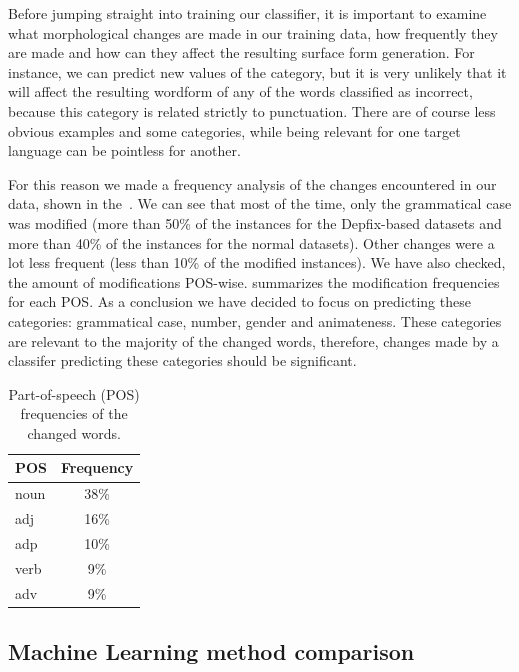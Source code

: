 Before jumping straight into training our classifier, it is important to examine what morphological
changes are made in our training data, how frequently they are made and how can they affect the resulting
surface form generation. For instance, we can predict new values of the  category,
but it is very unlikely that it will affect the resulting wordform of any of the words
classified as incorrect, because this category is related strictly to punctuation. There are
of course less obvious examples and some categories, while being relevant for one target language
can be pointless for another.

For this reason we made a frequency analysis of the changes encountered
in our data, shown in the~. We can see that most of the time, only the grammatical
case was modified (more than 50\% of the instances for the Depfix-based datasets and more than 40\% of the instances for
the normal datasets). Other changes were a lot less frequent (less than 10\% of the modified instances).
We have also checked, the amount of modifications POS-wise.  summarizes the modification frequencies for each
POS. As a conclusion we have decided to focus on predicting these categories: grammatical case, number, gender
and animateness. These categories are relevant to the majority of the changed words, therefore, changes made by
a classifer predicting these categories should be significant.

\begin{table}[t]
\centering
\small

\begin{tabular}{lc}
POS  &  Frequency  \\
\hline
noun    &   38\%  \\
adj     &   16\%  \\
adp     &   10\%  \\
verb    &   9\%  \\
adv     &   9\%  \\
\end{tabular}
\caption{
    Part-of-speech (POS) frequencies of the changed words.
}
\label{changes-pos}
\end{table}


\subsection{Machine Learning method comparison}

